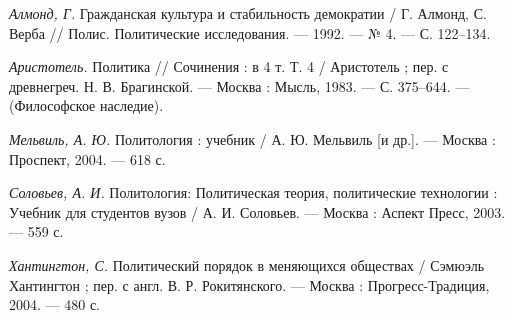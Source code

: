\textit{Алмонд, Г.} Гражданская культура и стабильность демократии / Г. Алмонд, С. Верба // Полис. Политические исследования. --- 1992. --- № 4. --- С. 122–134.

\textit{Аристотель.} Политика // Сочинения : в 4 т. Т. 4 / Аристотель ; пер. с древнегреч. Н. В. Брагинской. --- Москва : Мысль, 1983. --- С. 375–644. --- (Философское наследие).

\textit{Мельвиль, А. Ю.} Политология : учебник / А. Ю. Мельвиль [и др.]. --- Москва : Проспект, 2004. --- 618 с.

\textit{Соловьев, А. И.} Политология: Политическая теория, политические технологии : Учебник для студентов вузов / А. И. Соловьев. --- Москва : Аспект Пресс, 2003. --- 559 с.

\textit{Хантингтон, С.} Политический порядок в меняющихся обществах / Сэмюэль Хантингтон ; пер. с англ. В. Р. Рокитянского. --- Москва : Прогресс-Традиция, 2004. --- 480 с.